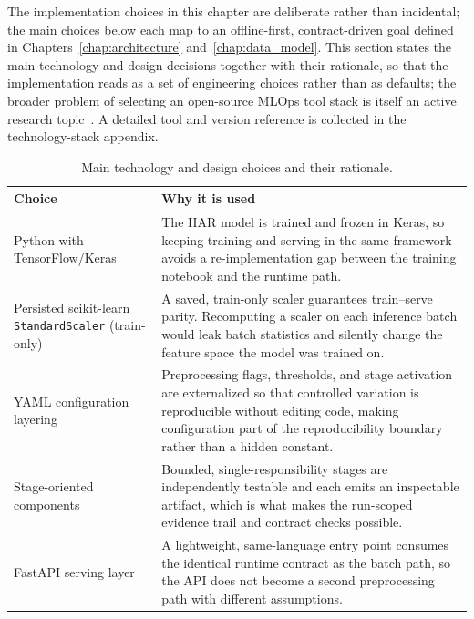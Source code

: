The implementation choices in this chapter are deliberate rather than incidental; the main choices below each map to an offline-first, contract-driven goal defined in Chapters~\ref{chap:architecture} and~\ref{chap:data_model}. This section states the main technology and design decisions together with their rationale, so that the implementation reads as a set of engineering choices rather than as defaults; the broader problem of selecting an open-source MLOps tool stack is itself an active research topic~\cite{ruf2021demystifying,hewage2022mlops}. A detailed tool and version reference is collected in the technology-stack appendix.

\renewcommand{\arraystretch}{1.25}
\begin{table}[htbp]
\centering
\footnotesize
\caption[Main technology and design choices and their rationale.]{Main technology and design choices and their rationale.}
\label{tab:technology_rationale}
\begin{tabularx}{\textwidth}{p{3.2cm} X}
\toprule
\textbf{Choice} & \textbf{Why it is used} \\
\midrule
Python with TensorFlow/Keras
& The HAR model is trained and frozen in Keras, so keeping training and serving in the same framework avoids a re-implementation gap between the training notebook and the runtime path. \\

Persisted scikit-learn \texttt{StandardScaler} (train-only)
& A saved, train-only scaler guarantees train--serve parity. Recomputing a scaler on each inference batch would leak batch statistics and silently change the feature space the model was trained on. \\

YAML configuration layering
& Preprocessing flags, thresholds, and stage activation are externalized so that controlled variation is reproducible without editing code, making configuration part of the reproducibility boundary rather than a hidden constant. \\

Stage-oriented components
& Bounded, single-responsibility stages are independently testable and each emits an inspectable artifact, which is what makes the run-scoped evidence trail and contract checks possible. \\

FastAPI serving layer
& A lightweight, same-language entry point consumes the identical runtime contract as the batch path, so the API does not become a second preprocessing path with different assumptions. \\


\end{tabularx}
\end{table}
